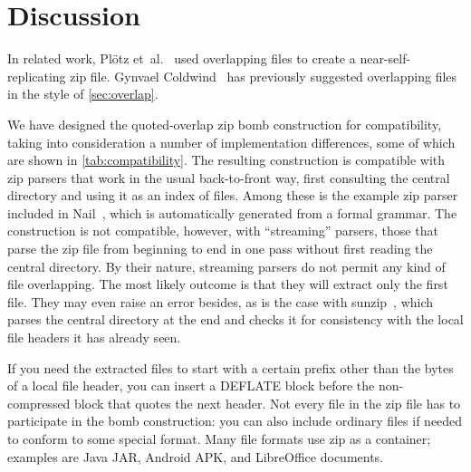 \documentclass[letterpaper,twocolumn,10pt]{article}
\begin{document}
\section{Discussion}
\label{sec:discussion}

In related work,
Plötz et~al.~\cite[\S 4]{SAR-PR-2006-04}
used overlapping files to create a
near-self-replicating zip file.
Gynvael Coldwind~\cite[p47]{gynvael}
has previously suggested
overlapping files in the style of \autoref{sec:overlap}.

We have designed the quoted-overlap zip bomb construction for compatibility,
taking into consideration a number of implementation differences,
some of which are shown in \autoref{tab:compatibility}.
The resulting construction is compatible with zip parsers that work
in the usual back-to-front way,
first consulting the central directory
and using it as an index of files.
Among these is the example
zip parser included in Nail~\cite{186219},
which is automatically generated from a formal grammar.
The construction is not compatible, however,
with ``streaming'' parsers,
those that parse the zip file from beginning to end in one pass
without first reading the central directory.
By their nature, streaming parsers
do not permit any kind of file overlapping.
The most likely outcome is that they
will extract only the first file.
They may even raise an error besides,
as is the case with \mbox{sunzip}~\cite{sunzip},
which parses the central directory at the end and checks it for consistency
with the local file headers it has already seen.

If you need the extracted files to start with a certain prefix
other than the bytes of a local file header,
you can insert a DEFLATE block before the
non-compressed block that quotes the next header.
Not every file in the zip file has to participate in the bomb construction:
you can also include ordinary files
if needed to conform to some special format.
Many file formats use zip as a container;
examples are Java JAR, Android APK, and LibreOffice documents.
\end{document}
